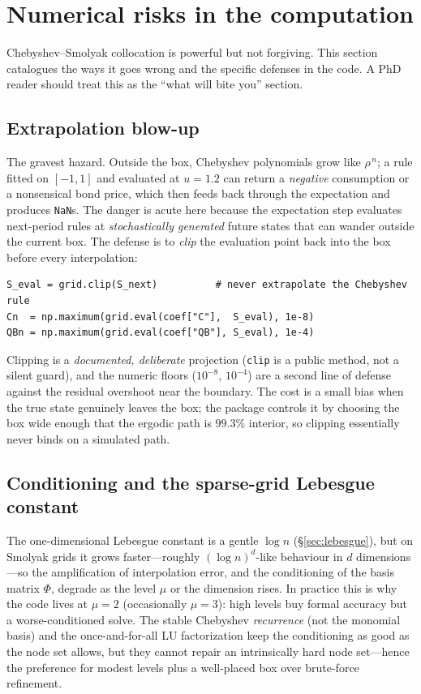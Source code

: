 \documentclass[11pt]{article}
\newcommand{\code}[1]{\texttt{#1}}
\begin{document}
\section{Numerical risks in the computation}
\label{sec:risks}

Chebyshev--Smolyak collocation is powerful but not forgiving. This section
catalogues the ways it goes wrong and the specific defenses in the code. A
PhD reader should treat this as the ``what will bite you'' section.

\subsection{Extrapolation blow-up}
\label{sec:risk-extrap}

The gravest hazard. Outside the box, Chebyshev polynomials grow like
$\rho^{\,n}$; a rule fitted on $[-1,1]$ and evaluated at $u=1.2$ can return
a \emph{negative} consumption or a nonsensical bond price, which then feeds
back through the expectation and produces \code{NaN}s. The danger is acute
here because the expectation step evaluates next-period rules at
\emph{stochastically generated} future states that can wander outside the
current box. The defense is to \emph{clip} the evaluation point back into
the box before every interpolation:
\begin{verbatim}
S_eval = grid.clip(S_next)          # never extrapolate the Chebyshev rule
Cn  = np.maximum(grid.eval(coef["C"],  S_eval), 1e-8)
QBn = np.maximum(grid.eval(coef["QB"], S_eval), 1e-4)
\end{verbatim}
Clipping is a \emph{documented, deliberate} projection (\code{clip} is a
public method, not a silent guard), and the numeric floors
($10^{-8}$, $10^{-4}$) are a second line of defense against the residual
overshoot near the boundary. The cost is a small bias when the true state
genuinely leaves the box; the package controls it by choosing the box wide
enough that the ergodic path is $99.3\%$ interior, so clipping essentially
never binds on a simulated path.

\subsection{Conditioning and the sparse-grid Lebesgue constant}

The one-dimensional Lebesgue constant is a gentle $\log n$
(\S\ref{sec:lebesgue}), but on Smolyak grids it grows faster---roughly
$(\log n)^{d}$-like behaviour in $d$ dimensions---so the amplification of
interpolation error, and the conditioning of the basis matrix $\Phi$,
degrade as the level $\mu$ or the dimension rises. In practice this is why
the code lives at $\mu=2$ (occasionally $\mu=3$): high levels buy formal
accuracy but a worse-conditioned solve. The stable Chebyshev
\emph{recurrence} (not the monomial basis) and the once-and-for-all LU
factorization keep the conditioning as good as the node set allows, but they
cannot repair an intrinsically hard node set---hence the preference for
modest levels plus a well-placed box over brute-force refinement.
\end{document}
